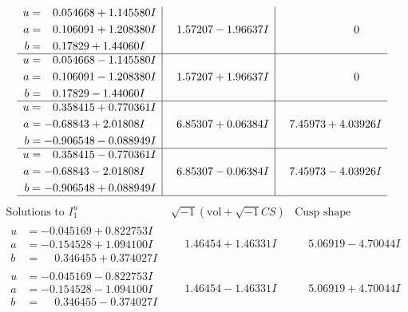 \documentclass[1p]{elsarticle_modified}
\theoremstyle{definition}
\newcommand{\I}{\sqrt{-1}}
\begin{document}
$$\begin{array}{c|c|c}
\begin{aligned}
u &= \phantom{-}0.054668 + 1.145580 I \\
a &= \phantom{-}0.106091 + 1.208380 I \\
b &= \phantom{-}0.17829 + 1.44060 I\end{aligned}
 & \phantom{-}1.57207 - 1.96637 I & \phantom{-0.000000 } 0 \\ \hline\begin{aligned}
u &= \phantom{-}0.054668 - 1.145580 I \\
a &= \phantom{-}0.106091 - 1.208380 I \\
b &= \phantom{-}0.17829 - 1.44060 I\end{aligned}
 & \phantom{-}1.57207 + 1.96637 I & \phantom{-0.000000 } 0 \\ \hline\begin{aligned}
u &= \phantom{-}0.358415 + 0.770361 I \\
a &= -0.68843 + 2.01808 I \\
b &= -0.906548 - 0.088949 I\end{aligned}
 & \phantom{-}6.85307 + 0.06384 I & \phantom{-}7.45973 + 4.03926 I \\ \hline\begin{aligned}
u &= \phantom{-}0.358415 - 0.770361 I \\
a &= -0.68843 - 2.01808 I \\
b &= -0.906548 + 0.088949 I\end{aligned}
 & \phantom{-}6.85307 - 0.06384 I & \phantom{-}7.45973 - 4.03926 I\\
 \hline 
 \end{array}$$\newpage$$\begin{array}{c|c|c}  
\text{Solutions to }I^u_{1}& \I (\text{vol} + \sqrt{-1}CS) & \text{Cusp shape}\\
 \hline 
\begin{aligned}
u &= -0.045169 + 0.822753 I \\
a &= -0.154528 + 1.094100 I \\
b &= \phantom{-}0.346455 + 0.374027 I\end{aligned}
 & \phantom{-}1.46454 + 1.46331 I & \phantom{-}5.06919 - 4.70044 I \\ \hline\begin{aligned}
u &= -0.045169 - 0.822753 I \\
a &= -0.154528 - 1.094100 I \\
b &= \phantom{-}0.346455 - 0.374027 I\end{aligned}
 & \phantom{-}1.46454 - 1.46331 I & \phantom{-}5.06919 + 4.70044 I \\ \hline\begin{aligned}

\end{aligned}
\end{array}$$
\end{document}

